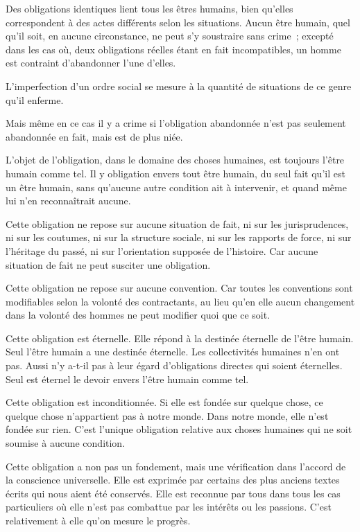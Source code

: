 \documentclass[french,twoside]{book} %
\begin{document}
Des obligations identiques lient tous les êtres humains, bien qu'elles correspondent à des actes différents selon les situations. Aucun être humain, quel qu'il soit, en aucune circonstance, ne peut s'y soustraire sans crime ; excepté dans les cas où, deux obligations réelles étant en fait incompatibles, un homme est contraint d'abandonner l'une d'elles.\par
L'imperfection d'un ordre social se mesure à la quantité de situations de ce genre qu'il enferme.\par
Mais même en ce cas il y a crime si l'obligation abandonnée n'est pas seulement abandonnée en fait, mais est de plus niée.\par
L'objet de l'obligation, dans le domaine des choses humaines, est toujours l'être humain comme tel. Il y obligation envers tout être humain, du seul fait qu'il est un être humain, sans qu'aucune autre condition ait à intervenir, et quand même lui n'en reconnaîtrait aucune.\par
Cette obligation ne repose sur aucune situation de fait, ni sur les jurisprudences, ni sur les coutumes, ni sur la structure sociale, ni sur les rapports de force, ni sur l'héritage du passé, ni sur l'orientation supposée de l'histoire. Car aucune situation de fait ne peut susciter une obligation.\par
Cette obligation ne repose sur aucune convention. Car toutes les conventions sont modifiables selon la volonté des contractants, au lieu qu'en elle aucun changement dans la volonté des hommes ne peut modifier quoi que ce soit.\par
Cette obligation est éternelle. Elle répond à la destinée éternelle de l'être humain. Seul l'être humain a une destinée éternelle. Les collectivités humaines n'en ont pas. Aussi n'y a-t-il pas à leur égard d'obligations directes qui soient éternelles. Seul est éternel le devoir envers l'être humain comme tel.\par
Cette obligation est inconditionnée. Si elle est fondée sur quelque chose, ce quelque chose n'appartient pas à notre monde. Dans notre monde, elle n'est fondée sur rien. C'est l'unique obligation relative aux choses humaines qui ne soit soumise à aucune condition.\par
Cette obligation a non pas un fondement, mais une vérification dans l'accord de la conscience universelle. Elle est exprimée par certains des plus anciens textes écrits qui nous aient été conservés. Elle est reconnue par tous dans tous les cas particuliers où elle n'est pas combattue par les intérêts ou les passions. C'est relativement à elle qu'on mesure le progrès.\par
\end{document}

